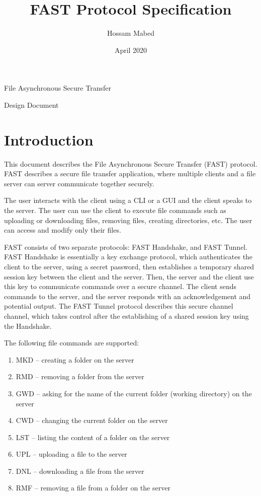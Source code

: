 \documentclass[12pt]{article}
\title{FAST Protocol Specification}
\author{Hossam Mabed}
\date{April 2020}
\begin{document}
\thispagestyle{empty}
\maketitle
\begin{center}
    \large{File Asynchronous Secure Transfer}
    
    Design Document
\end{center}

\newpage

\section{Introduction}

This document describes the File Asynchronous Secure Transfer (FAST) protocol. FAST describes a secure file transfer application, where multiple clients and a file server can  server communicate together securely.

The user interacts with the client using a CLI or a GUI and the client speaks to the server. The user can use the client to execute file commands such as uploading or downloading files, removing files, creating directories, etc. The user can access and modify only their files. 

FAST consists of two separate protocols: FAST Handshake, and FAST Tunnel. FAST Handshake is essentially a key exchange protocol, which authenticates the client to the server, using a secret password, then establishes a temporary shared session key between the client and the server. Then, the server and the client use this key to communicate commands over a secure channel. The client sends commands to the server, and the server responds with an acknowledgement and potential output. The FAST Tunnel protocol describes this secure channel channel, which takes control after the establishing of a shared session key using the Handshake.

\bigskip
\noindent The following file commands are supported:
\begin{enumerate}
    \item MKD – creating a folder on the server
    \item RMD – removing a folder from the server
    \item GWD – asking for the name of the current folder (working directory) on the server
    \item CWD – changing the current folder on the server
    \item LST – listing the content of a folder on the server
    \item UPL – uploading a file to the server
    \item DNL – downloading a file from the server
    \item RMF – removing a file from a folder on the server
\end{enumerate}
\end{document}
